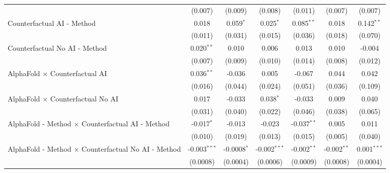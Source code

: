 \begin{tabular}{lcccccc}
                                                              & (0.007)        & (0.009)       & (0.008)        & (0.011)       & (0.007)       & (0.007)\\   
   Counterfactual AI - Method                                 & 0.018          & 0.059$^{*}$   & 0.025$^{*}$    & 0.085$^{**}$  & 0.018         & 0.142$^{**}$\\   
                                                              & (0.011)        & (0.031)       & (0.015)        & (0.036)       & (0.018)       & (0.070)\\   
   Counterfactual No AI - Method                              & 0.020$^{**}$   & 0.010         & 0.006          & 0.013         & 0.010         & -0.004\\   
                                                              & (0.007)        & (0.009)       & (0.010)        & (0.014)       & (0.008)       & (0.012)\\   
   AlphaFold $\times$ Counterfactual AI                       & 0.036$^{**}$   & -0.036        & 0.005          & -0.067        & 0.044         & 0.042\\   
                                                              & (0.016)        & (0.044)       & (0.024)        & (0.051)       & (0.036)       & (0.109)\\   
   AlphaFold $\times$ Counterfactual No AI                    & 0.017          & -0.033        & 0.038$^{*}$    & -0.033        & 0.009         & 0.040\\   
                                                              & (0.031)        & (0.040)       & (0.022)        & (0.046)       & (0.038)       & (0.065)\\   
   AlphaFold - Method $\times$ Counterfactual AI - Method     & -0.017$^{*}$   & -0.013        & -0.023         & -0.037$^{**}$ & 0.005         & 0.011\\   
                                                              & (0.010)        & (0.019)       & (0.013)        & (0.015)       & (0.005)       & (0.040)\\   
   AlphaFold - Method $\times$ Counterfactual No AI - Method  & -0.003$^{***}$ & -0.0008$^{*}$ & -0.002$^{***}$ & -0.002$^{**}$ & -0.002$^{**}$ & 0.001$^{***}$\\   
                                                              & (0.0008)       & (0.0004)      & (0.0006)       & (0.0009)      & (0.0008)      & (0.0004)\\   
   \midrule

\end{tabular}
